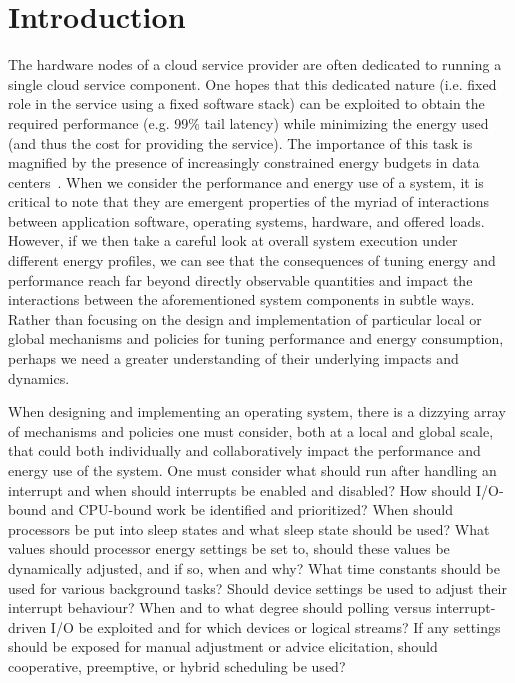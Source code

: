\section{Introduction}

The hardware nodes of a cloud service provider are often dedicated to running a single cloud service component.
One hopes that this dedicated nature (i.e. fixed role in the service using a fixed software stack) can be exploited to obtain the required performance (e.g. 99\% tail latency) while minimizing the energy used (and thus the cost for providing the service). 
The importance of this task is magnified by the presence of increasingly constrained energy budgets in data centers~\cite{SmoothOperator, Dynamo, oldi}. 
When we consider the performance and energy use of a system, it is critical to note that they are emergent properties of the myriad of interactions between application software, operating systems, hardware, and offered loads.
However, if we then take a careful look at overall system execution under different energy profiles, we can see that the consequences of tuning energy and performance reach far beyond directly observable quantities and impact the interactions between the aforementioned system components in subtle ways.
Rather than focusing on the design and implementation of particular local or global mechanisms and policies for tuning performance and energy consumption, perhaps we need a greater understanding of their underlying impacts and dynamics.   

When designing and implementing an operating system, there is a dizzying array of mechanisms and policies one must consider, both at a local and global scale, that could both individually and collaboratively impact the performance and energy use of the system.
One must consider what should run after handling an interrupt and when should interrupts be enabled and disabled?
How should I/O-bound and CPU-bound work be identified and prioritized?
When should processors be put into sleep states and what sleep state should be used?
What values should processor energy settings be set to, should these values be dynamically adjusted, and if so, when and why?
What time constants should be used for various background tasks?
Should device settings be used to adjust their interrupt behaviour?
When and to what degree should polling versus interrupt-driven I/O be exploited and for which devices or logical streams?
If any settings should be exposed for manual adjustment or advice elicitation, should cooperative, preemptive, or hybrid scheduling be used?

